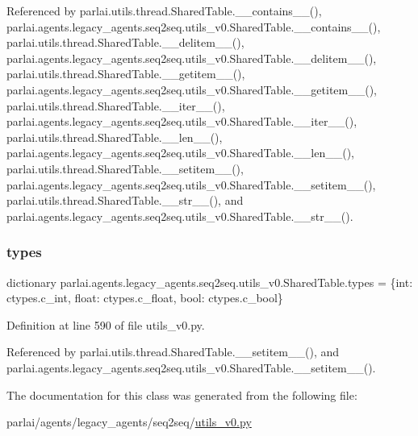 Referenced by parlai.\+utils.\+thread.\+Shared\+Table.\+\_\+\+\_\+contains\+\_\+\+\_\+(), parlai.\+agents.\+legacy\+\_\+agents.\+seq2seq.\+utils\+\_\+v0.\+Shared\+Table.\+\_\+\+\_\+contains\+\_\+\+\_\+(), parlai.\+utils.\+thread.\+Shared\+Table.\+\_\+\+\_\+delitem\+\_\+\+\_\+(), parlai.\+agents.\+legacy\+\_\+agents.\+seq2seq.\+utils\+\_\+v0.\+Shared\+Table.\+\_\+\+\_\+delitem\+\_\+\+\_\+(), parlai.\+utils.\+thread.\+Shared\+Table.\+\_\+\+\_\+getitem\+\_\+\+\_\+(), parlai.\+agents.\+legacy\+\_\+agents.\+seq2seq.\+utils\+\_\+v0.\+Shared\+Table.\+\_\+\+\_\+getitem\+\_\+\+\_\+(), parlai.\+utils.\+thread.\+Shared\+Table.\+\_\+\+\_\+iter\+\_\+\+\_\+(), parlai.\+agents.\+legacy\+\_\+agents.\+seq2seq.\+utils\+\_\+v0.\+Shared\+Table.\+\_\+\+\_\+iter\+\_\+\+\_\+(), parlai.\+utils.\+thread.\+Shared\+Table.\+\_\+\+\_\+len\+\_\+\+\_\+(), parlai.\+agents.\+legacy\+\_\+agents.\+seq2seq.\+utils\+\_\+v0.\+Shared\+Table.\+\_\+\+\_\+len\+\_\+\+\_\+(), parlai.\+utils.\+thread.\+Shared\+Table.\+\_\+\+\_\+setitem\+\_\+\+\_\+(), parlai.\+agents.\+legacy\+\_\+agents.\+seq2seq.\+utils\+\_\+v0.\+Shared\+Table.\+\_\+\+\_\+setitem\+\_\+\+\_\+(), parlai.\+utils.\+thread.\+Shared\+Table.\+\_\+\+\_\+str\+\_\+\+\_\+(), and parlai.\+agents.\+legacy\+\_\+agents.\+seq2seq.\+utils\+\_\+v0.\+Shared\+Table.\+\_\+\+\_\+str\+\_\+\+\_\+().

\mbox{\label{classparlai_1_1agents_1_1legacy__agents_1_1seq2seq_1_1utils__v0_1_1SharedTable_ac7e68f60287f180ffacb892540d737b8}} 
\subsubsection{\texorpdfstring{types}{types}}
{\footnotesize\ttfamily dictionary parlai.\+agents.\+legacy\+\_\+agents.\+seq2seq.\+utils\+\_\+v0.\+Shared\+Table.\+types = \{int\+: ctypes.\+c\+\_\+int, float\+: ctypes.\+c\+\_\+float, bool\+: ctypes.\+c\+\_\+bool\}\hspace{0.3cm}{\ttfamily [static]}}



Definition at line 590 of file utils\+\_\+v0.\+py.



Referenced by parlai.\+utils.\+thread.\+Shared\+Table.\+\_\+\+\_\+setitem\+\_\+\+\_\+(), and parlai.\+agents.\+legacy\+\_\+agents.\+seq2seq.\+utils\+\_\+v0.\+Shared\+Table.\+\_\+\+\_\+setitem\+\_\+\+\_\+().



The documentation for this class was generated from the following file\+:\begin{DoxyCompactItemize}
\item 
parlai/agents/legacy\+\_\+agents/seq2seq/\hyperlink{utils__v0_8py}{utils\+\_\+v0.\+py}\end{DoxyCompactItemize}
